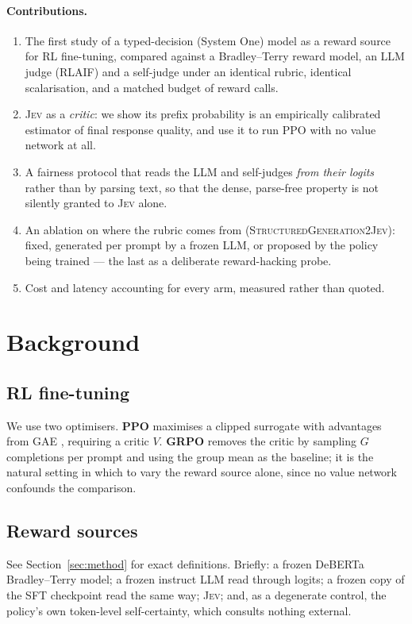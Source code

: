 \documentclass[11pt]{article}
\newcommand{\jev}{\textsc{Jev}}
\begin{document}
\paragraph{Contributions.}
\begin{enumerate}
  \item The first study of a typed-decision (System One) model as a reward
    source for RL fine-tuning, compared against a Bradley--Terry reward model,
    an LLM judge (RLAIF) and a self-judge under an identical rubric, identical
    scalarisation, and a matched budget of reward calls.
  \item \jev{} as a \emph{critic}: we show its prefix probability is an
    empirically calibrated estimator of final response quality, and use it to
    run PPO with no value network at all.
  \item A fairness protocol that reads the LLM and self-judges
    \emph{from their logits} rather than by parsing text, so that the
    dense, parse-free property is not silently granted to \jev{} alone.
  \item An ablation on where the rubric comes from
    (\textsc{StructuredGeneration2Jev}): fixed, generated per prompt by a frozen
    LLM, or proposed by the policy being trained --- the last as a deliberate
    reward-hacking probe.
  \item Cost and latency accounting for every arm, measured rather than quoted.
\end{enumerate}

\section{Background}

\subsection{RL fine-tuning}
We use two optimisers. \textbf{PPO} \citep{schulman2017ppo} maximises a clipped
surrogate with advantages from GAE \citep{schulman2016gae}, requiring a critic
$V$. \textbf{GRPO} \citep{shao2024deepseekmath} removes the critic by sampling
$G$ completions per prompt and using the group mean as the baseline; it is the
natural setting in which to vary the reward source alone, since no value network
confounds the comparison.

\subsection{Reward sources}
\label{sec:sources}
See Section~\ref{sec:method} for exact definitions. Briefly: a frozen DeBERTa
Bradley--Terry model; a frozen instruct LLM read through logits; a frozen copy of
the SFT checkpoint read the same way; \jev{}; and, as a degenerate control, the
policy's own token-level self-certainty, which consults nothing external.
\end{document}
